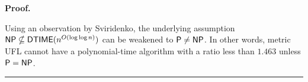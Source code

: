 \documentclass[oneside,final]{ucr}
\newenvironment{proof}[1][Proof]{\textbf{#1.} }{\ \rule{0.5em}{0.5em}}
\begin{document}
\begin{proof}

  Using an observation by Sviridenko, the underlying
  assumption\\ ${\mbox{\sf NP}} \nsubseteq {\mbox{\sf DTIME}}(n^{O(\log\log n)})$
  can be weakened to ${\mbox{\sf P}} \neq {\mbox{\sf NP}}$. In other words, metric
  UFL cannot have a polynomial-time algorithm with a ratio
  less than $1.463$ unless ${\mbox{\sf P}} = {\mbox{\sf NP}}$.
\end{proof}
\end{document}
